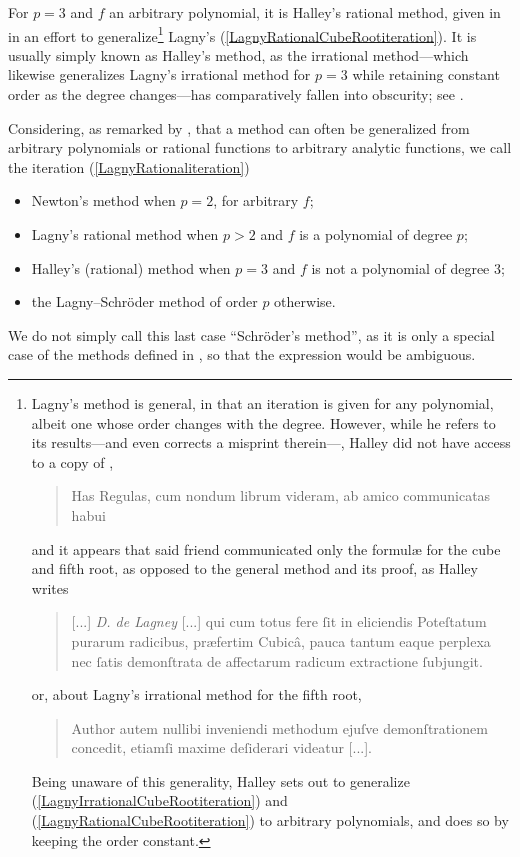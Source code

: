 ﻿\documentclass[10pt, a4paper, twoside]{basestyle}
\begin{document}
For $p=3$ and $f$ an arbitrary polynomial, it is Halley's rational method, given in \cite[142--143]{Halley1694} in
an effort to generalize\footnote{Lagny's method is general, in that an iteration is given for any
polynomial, albeit one whose order changes with the degree. However, while he refers to its
results---and even corrects a misprint therein---, Halley
did not have access to a copy of \cite{FantetdeLagny1692},
\begin{quote}
Has Regulas, cum nondum librum videram, ab amico communicatas habui
\end{quote}
and it appears that said friend communicated only the formulæ for the cube and fifth root, as opposed to the
general method and its proof, as Halley writes
\begin{quote}
[...] \emph{D. de Lagney} [...] qui cum totus fere ſit in eliciendis Poteſtatum purarum radicibus,
præfertim Cubicâ, pauca tantum eaque perplexa nec ſatis demonſtrata de affectarum radicum
extractione ſubjungit.
\end{quote}
or, about Lagny's irrational method for the fifth root,
\begin{quote}
Author autem nullibi inveniendi methodum ejuſve demonſtrationem concedit,
etiamſi maxime deſiderari videatur [...].
\end{quote}
Being unaware of this generality, Halley sets out to generalize (\ref{LagnyIrrationalCubeRootiteration}) and (\ref{LagnyRationalCubeRootiteration}) to
arbitrary polynomials, and does so by keeping the order constant.} Lagny's (\ref{LagnyRationalCubeRootiteration}).
It is usually simply known as Halley's method, as the irrational method---which likewise generalizes Lagny's irrational
method for $p=3$ while retaining constant order as the degree changes---has comparatively fallen into obscurity;
see \cite{ScavoThoo1995}.

Considering, as remarked by \cite[334]{Schröder1870}, that a method can often
be generalized from arbitrary polynomials or rational functions to arbitrary
analytic functions, we call the iteration (\ref{LagnyRationaliteration})\begin{itemize}[nosep]
\item Newton’s method when $p=2$, for arbitrary $f$;
\item Lagny’s rational method when $p>2$ and $f$ is a polynomial of degree $p$;
\item Halley’s (rational) method when $p=3$ and $f$ is not a polynomial of degree $3$;
\item the Lagny--Schröder method of order $p$ otherwise.
\end{itemize}
We do not simply call this last case ``Schröder’s method'', as it is only a special case of the methods
defined in \cite{Schröder1870}, so that the expression would be ambiguous. 
\end{document}
